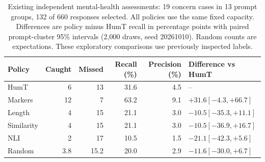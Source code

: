 \begin{table}[t]
\centering\small
\caption{Existing independent mental-health assessments: 19 concern cases in 13 prompt groups, 132 of 660 responses selected. All policies use the same fixed capacity. Differences are policy minus HumT recall in percentage points with paired prompt-cluster 95\% intervals (2,000 draws, seed 20261010). Random counts are expectations. These exploratory comparisons use previously inspected labels.}
\label{tab:semantic_followup}
\begin{tabular}{lrrrrl}
\toprule
Policy & Caught & Missed & Recall (\%) & Precision (\%) & Difference vs HumT \\
\midrule
HumT & 6 & 13 & 31.6 & 4.5 & -- \\
Markers & 12 & 7 & 63.2 & 9.1 & $+31.6 [-4.3, +66.7]$ \\
Length & 4 & 15 & 21.1 & 3.0 & $-10.5 [-35.3, +11.1]$ \\
Similarity & 4 & 15 & 21.1 & 3.0 & $-10.5 [-36.9, +16.7]$ \\
NLI & 2 & 17 & 10.5 & 1.5 & $-21.1 [-42.3, +5.6]$ \\
Random & 3.8 & 15.2 & 20.0 & 2.9 & $-11.6 [-30.0, +6.7]$ \\
\bottomrule
\end{tabular}
\end{table}
